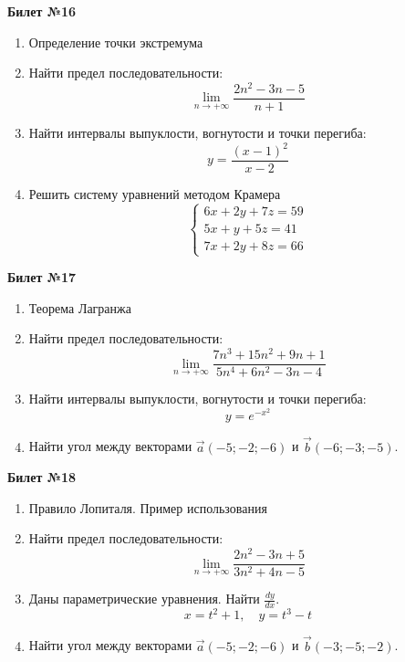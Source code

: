 \documentclass[a4paper, 12pt]{article}
\begin{document}
\begin{center}
    \textbf{Билет №16}
\end{center}
\begin{enumerate}
\item Определение точки экстремума
\item Найти предел последовательности:  
\[\lim \limits_{n \to +\infty} \frac{2n^2 - 3n - 5}{n + 1}\]
\item Найти интервалы выпуклости, вогнутости и точки перегиба:
\[y = \frac{(x-1)^2}{x-2}\]
\item Решить систему уравнений методом Крамера
\[
	\begin{cases}
		6x + 2y + 7z = 59 \\
		5x + y + 5z = 41 \\
		7x + 2y + 8z = 66
	\end{cases}
\]
\end{enumerate}

\begin{center}
    \textbf{Билет №17}
\end{center}
\begin{enumerate}
\item Теорема Лагранжа
\item Найти предел последовательности:  
\[\lim \limits_{n \to +\infty} \frac{7n^3 + 15n^2 + 9n + 1}{5n^4 + 6n^2 - 3n - 4}\]
\item Найти интервалы выпуклости, вогнутости и точки перегиба:
\[y = e^{-x^2}\]
\item Найти угол между векторами $\overrightarrow{a}(-5;-2;-6)$ и $\overrightarrow{b}(-6; -3; -5)$.
\end{enumerate}

\begin{center}
    \textbf{Билет №18}
\end{center}
\begin{enumerate}
\item Правило Лопиталя. Пример использования
\item Найти предел последовательности:  
\[\lim \limits_{n \to +\infty} \frac{2n^2 - 3n + 5}{3n^2 + 4n - 5}\]
\item Даны параметрические уравнения.  Найти \( \displaystyle \frac{dy}{dx}\). 
\[
x = t^2 + 1, \quad y = t^3 - t
\]
\item Найти угол между векторами $\overrightarrow{a}(-5;-2;-6)$ и $\overrightarrow{b}(-3;-5;-2)$.
\end{enumerate}
\end{document}
